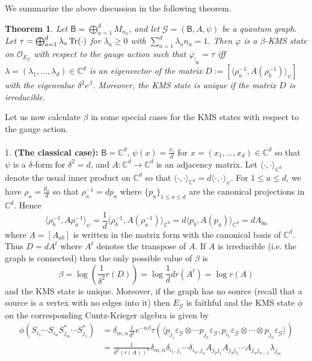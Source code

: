 \documentclass[a4paper,reqno]{amsart}
\numberwithin{equation}{section}
\newtheorem{theorem}{Theorem}
\numberwithin{theorem}{section}
\theoremstyle{definition}\newtheorem{definition}[theorem]{Definition}
\theoremstyle{definition}\newtheorem{remark}[theorem]{Remark}
\theoremstyle{definition}\newtheorem{example}[theorem]{Example}
\theoremstyle{definition}\newtheorem*{notation*}{Notation}
\theoremstyle{definition}\newtheorem*{convention*}{Convention}
\theoremstyle{definition}\newtheorem{observation}{Observation}
\theoremstyle{definition}\newtheorem*{acknowledgment*}{Acknowledgments}
\newcommand{\C}{\mathbb{C}}
\newcommand{\B}{\mathsf{B}}
\newcommand{\G}{\mathcal{G}}
\begin{document}
We summarize the above discussion in the following theorem.
\begin{theorem}\label{Thm:KMS}
    Let $\B=\bigoplus_{a=1}^d M_{n_a}$, and let $\G=(\B, A,\psi)$ be a quantum graph. Let $\tau=\bigoplus_{a=1}^d\lambda_a\Tr(\cdot)$ for $\lambda_a\geq 0$ with $\sum_{a=1}^d\lambda_a n_a=1$. Then $\varphi$ is a $\beta$-KMS state on $\mathcal{O}_{E_\G}$ with respect to the gauge action such that $\varphi_{|_\B}=\tau$ iff $\lambda=(\lambda_1,\ldots,\lambda_d)\in\C^d$ is an eigenvector of the matrix $D:=[\langle\rho_a^{-1}, A(\rho_{b}^{-1})\rangle_\psi]$ with the eigenvalue $\delta^2e^\beta$. Moreover, the KMS state is unique if the matrix $D$ is irreducible.
\end{theorem}


Let us now calculate $\beta$ in some special cases for the KMS states with respect to the gauge action.
\\
\\
1. \textbf{(The classical case):} $\B=\C^d$, $\psi(x)=\frac{x_i}{d}$ for $x=(x_1,\ldots,x_d)\in \C^d$ so that $\psi$ is a $\delta$-form for $\delta^2=d$, and $A:\C^d\to\C^d$ is an adjacency matrix. Let $\langle\cdot,\cdot\rangle_{\C^d}$ denote the usual inner product on $\C^d$ so that $\langle\cdot,\cdot\rangle_{\C^d}=d\langle\cdot,\cdot\rangle_\psi$. For $1\leq a\leq d$, we have $\rho_a=\frac{p_a}{d}$ so that $\rho_a^{-1}=dp_a$ where $\{p_a\}_{1\leq a\leq d}$ are the canonical projections in $\C^d$. Hence
\[\langle\rho_b^{-1},A\rho_a^{-1}\rangle_\psi=\frac{1}{d}\langle\rho_b^{-1},A(\rho_a^{-1})\rangle_{\C^d}=d\langle p_b,A(p_a)\rangle_{\C^d}=dA_{ba}\]
where $A=[A_{ab}]$ is written in the matrix form with the canonical basis of $\C^d$. Thus $D=dA^t$ where $A^t$ denotes the transpose of $A$. 
If $A$ is irreducible (i.e. the graph is connected) then the only possible value of $\beta$ is
\[\beta=\log(\frac{1}{\delta^2}r(D))=\log \frac{1}{d}dr(A^t)=\log r(A)\]
and the KMS state is unique. Moreover, if the graph has no source (recall that a source is a vertex with no edges into it) then $E_\G$ is faithful and the KMS state $\phi$ on the corresponding  Cuntz-Krieger  algebra is given by
\begin{align*}
    \phi(S_{i_1}\cdots S_{i_n}S_{j_m}^*\cdots S_{j_1}^*)&=\delta_{m,n}\frac{1}{d^2}e^{-n\beta}\tau(\langle p_{j_1}\varepsilon_\G\otimes\cdots p_{j_n}\varepsilon_\G, p_{i_1}\varepsilon_\G\otimes\cdots \otimes p_{j_n}\varepsilon_\G\rangle)\\
&=\frac{1}{d^2(r(A))^n}\delta_{m,n}\delta_{i_1,j_1}\cdots\delta_{i_n,j_n}A_{j_2j_1} A_{j_3j_2}\cdots A_{j_nj_{n-1}}\lambda_{j_m} 
\end{align*}
\end{document}
